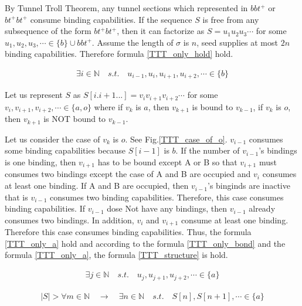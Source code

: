 \documentclass[runningheads]{llncs}
\begin{document}
By Tunnel Troll Theorem, any tunnel sections which represented in $bbt^+$ or $bt^+bt^+$ consume binding capabilities. If the sequence $S$ is free from any subsequence of the form $bt^+bt^+$, then it can factorize as $S = u_1 u_2 u_3 \cdots$ for some $u_1 , u_2 , u_3 , \cdots \in \{b\} \cup bbt^+$. Assume the length of $\sigma$ is $n$, seed supplies at most $2n$ binding capabilities. Therefore formula \ref{TTT_only_hold} hold.

\begin{eqnarray}
  \exists i \in \mathbb{N} \quad s.t. \quad u_{i-1} , u_i , u_{i+1} , u_{i+2} , \cdots \in \{ b \}
  \label{TTT_only_bond}
\end{eqnarray}


Let us represent $S$ as $S[i.i+1...] = v_i v_{i+1} v_{i+2} \cdots$ for some $v_i, v_{i+1}, v_{i+2}, \cdots \in \{ a, o\}$ where if $v_k$ is $a$, then $v_{k+1}$ is bound to $v_{k-1}$, if $v_k$ is $o$, then $v_{k+1}$ is NOT bound to $v_{k-1}$.


Let us consider the case of $v_k$ is $o$. See Fig.\ref{TTT_case_of_o}. $v_{i-1}$ consumes some binding capabilities because $S[i-1]$ is $b$. If the number of $v_{i-1}$'s bindings is one binding, then $v_{i+1}$ has to be bound except A or B so that $v_{i+1}$ must consumes two bindings except the case of A and B are occupied and $v_i$ consumes at least one binding. If A and B are occupied, then $v_{i-1}$'s binginds are inactive that is $v_{i-1}$ consumes two binding capabilities. Therefore, this case consumes binding capabilities. If $v_{i-1}$ dose Not have any bindings, then $v_{i-1}$ already consumes two bindings. In addition, $v_i$ and $v_{i+1}$ consume at least one binding. Therefore this case consumes binding capabilities. Thus, the formula \ref{TTT_only_a} hold and according to the formula \ref{TTT_only_bond} and the formula \ref{TTT_only_a}, the formula \ref{TTT_structure} is hold.

\begin{eqnarray}
  \exists j \in \mathbb{N} \quad s.t. \quad u_j , u_{j+1} , u_{j+2} , \cdots \in \{ a \}
  \label{TTT_only_a}
\end{eqnarray}

\begin{eqnarray}
  | S | > \forall m \in \mathbb{N} \quad \to \quad \exists n \in \mathbb{N} \quad s.t. \quad S[n], S[n+1], \cdots \in \{ a \}
  \label{TTT_structure}
\end{eqnarray}
\end{document}
